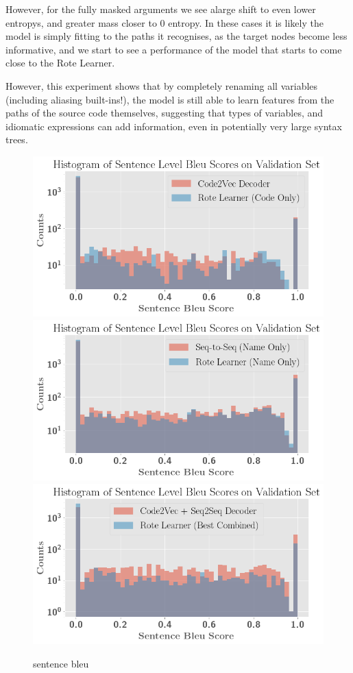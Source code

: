 However, for the fully masked arguments we see alarge shift to even lower entropys, and greater mass closer to 0 entropy. In these cases it is likely the model is simply fitting to the paths it recognises, as the target nodes become less informative, and we start to see a performance of the model that starts to come close to the Rote Learner.

However, this experiment shows that by completely renaming all variables (including aliasing built-ins!), the model is still able to learn features from the paths of the source code themselves, suggesting that types of variables, and idiomatic expressions can add information, even in potentially very large syntax trees.


\begin{figure}
\begin{center}
\includegraphics[width=0.75\linewidth]{ImagesCodeRelated/pretty_sentence_c2v.png}
\includegraphics[width=.75\linewidth]{ImagesCodeRelated/pretty_sentence_bleu_s2s.png}
\includegraphics[width=.75\linewidth]{ImagesCodeRelated/pretty_sentence_bleu_c2e.png}
\end{center}
\caption{sentence bleu}
\label{fig:sentence_bleu}

\end{figure}

